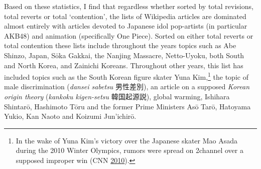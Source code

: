 \documentclass[10pt,british,A4paper,,openany]{memoir}
\begin{document}
\begin{table}[!htb]
\footnotesize
\centering
\setlength{\tabcolsep}{5pt}
\caption{50 most contentious articles on the Japanese Wikipedia (2019)}\label{tab:50mostcont}
\end{table}

Based on these statistics, I find that regardless whether sorted by
total revisions, total reverts or total `contention', the lists of
Wikipedia articles are dominated almost entirely with articles devoted
to Japanese idol pop-artists (in particular AKB48) and animation
(specifically One Piece). Sorted on either total reverts or total
contention these lists include throughout the years topics such as Abe
Shinzo, Japan, Sōka Gakkai, the Nanjing Massacre, Netto-Uyoku, both
South and North Korea, and Zainichi Koreans. Throughout other years,
this list has included topics such as the South Korean figure skater
Yuna Kim,\footnote{In the wake of Yuna Kim's victory over the Japanese
  skater Mao Asada during the 2010 Winter Olympics, rumors were spread
  on 2channel over a supposed improper win (CNN
  \protect\hyperlink{ref-cnn_korean_2010}{2010}).} the topic of male
discrimination (\emph{dansei sabetsu} 男性差別), an article on a
supposed \emph{Korean origin theory} (\emph{kankoku kigen-setsu}
韓国起源説), global warming, Ishihara Shintarō, Hashimoto Tōru and the
former Prime Ministers Asō Tarō, Hatoyama Yukio, Kan Naoto and Koizumi
Jun'ichirō.
\end{document}
